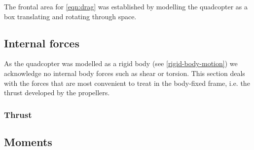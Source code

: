 The frontal area for \cref{eqn:drag} was established by modelling the quadcopter as a box translating and rotating through space.
\subsection{Internal forces}
As the quadcopter was modelled as a rigid body (see \cref{rigid-body-motion}) we acknowledge no internal body forces such as shear or torsion. This section deals with the forces that are most convenient to treat in the body-fixed frame, i.e. the thrust developed by the propellers.
\subsubsection[Thrust]{Thrust  }
\subsection{Moments}